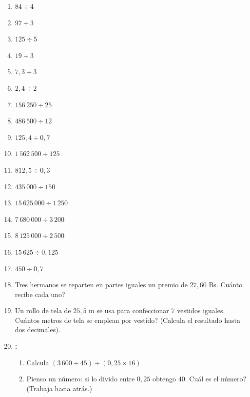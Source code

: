 \documentclass[12pt, letterpaper]{article}
\begin{document}
\begin{enumerate}[leftmargin=*, start=85]
  \item \facil{} $84 \div 4$

  \item \facil{} $97 \div 3$

  \item \facil{} $125 \div 5$

  \item \facil{} $19 \div 3$

  \item \facil{} $7{,}3 \div 3$

  \item \facil{} $2{,}4 \div 2$

  \item \medio{} $156\,250 \div 25$

  \item \medio{} $486\,500 \div 12$

  \item \medio{} $125{,}4 \div 0{,}7$

  \item \medio{} $1\,562\,500 \div 125$

  \item \medio{} $812{,}5 \div 0{,}3$

  \item \medio{} $435\,000 \div 150$

  \item \medio{} $15\,625\,000 \div 1\,250$

  \item \medio{} $7\,680\,000 \div 3\,200$

  \item \medio{} $8\,125\,000 \div 2\,500$

  \item \dificil{} $15\,625 \div 0{,}125$

  \item \dificil{} $450 \div 0{,}7$

  \item \dificil{} Tres hermanos se reparten en partes iguales un premio de $27{,}60$ Bs. \textquestiondown Cuánto recibe cada uno?

  \item \dificil{} Un rollo de tela de $25{,}5$ m se usa para confeccionar $7$ vestidos iguales. \textquestiondown Cuántos metros de tela se emplean por vestido? (Calcula el resultado hasta dos decimales).

  \item \dificil{} \textbf{:}
        \begin{enumerate}[label=\alph*)]
          \item Calcula $(3\,600 \div 45) \div (0{,}25 \times 16)$.
          \item Pienso un número: si lo divido entre $0{,}25$ obtengo $40$. \textquestiondown Cuál es el número? (Trabaja hacia atrás.)
        \end{enumerate}
\end{enumerate}
\end{document}
